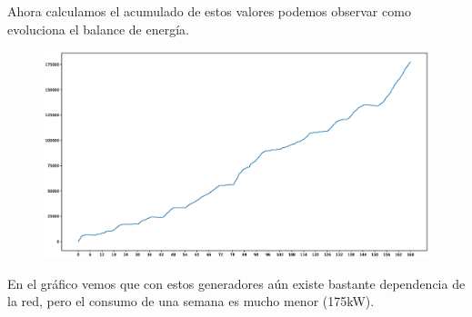 Ahora calculamos el acumulado de estos valores podemos observar como evoluciona el
balance de energía. 

\begin{figure}[H]
    \centering
    \includegraphics[scale=0.3]{images/acc.eps}
\end{figure}

En el gráfico vemos que con estos generadores aún existe bastante dependencia de la red,
pero el consumo de una semana es mucho menor (175kW).